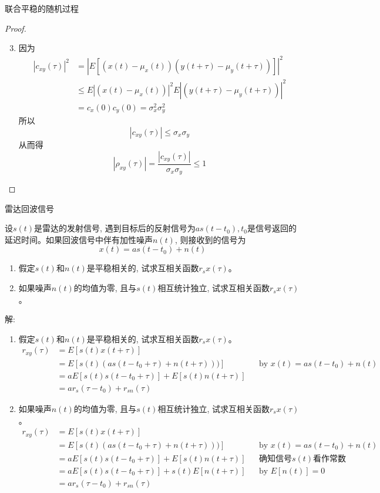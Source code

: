 \begin{frame}{联合平稳的随机过程}
\begin{proof}
	\begin{enumerate}
		\setcounter{enumi}{2} %
		\item 因为 
		\begin{align*}
		|c_{xy}(\tau)|^2&=|E[(x(t)-\mu_x(t))(y(t+\tau)-\mu_y(t+\tau))]|^2\\
		&\le E|(x(t)-\mu_x(t))|^2E|(y(t+\tau)-\mu_y(t+\tau))|^2\\
		&=c_x(0)c_y(0)=\sigma_x^2\sigma_y^2
		\end{align*}
		所以 
		\[|c_{xy}(\tau)|\le\sigma_x\sigma_y \]
		从而得
		\[|\rho_{xy}(\tau)|=\frac{|c_{xy}(\tau)|}{\sigma_x\sigma_y}\le 1 \]
	\end{enumerate}
\end{proof}
\end{frame}

\begin{frame}{雷达回波信号}
\begin{example}
	设$s(t)$是雷达的发射信号, 遇到目标后的反射信号为$as(t-t_0), t_0$是信号返回的延迟时间。如果回波信号中伴有加性噪声$n(t)$, 则接收到的信号为
	\[x(t)=as(t-t_0)+n(t) \]
	\begin{enumerate}
		\item 假定$s(t)$和$n(t)$是平稳相关的, 试求互相关函数$r_sx(\tau)$。
		\item 如果噪声$n(t)$的均值为零, 且与$s(t)$相互统计独立, 试求互相关函数$r_sx(\tau)$。
	\end{enumerate}
\end{example}
\end{frame}

\begin{frame}[shrink]
解:
	\begin{enumerate}
		\item 假定$s(t)$和$n(t)$是平稳相关的, 试求互相关函数$r_sx(\tau)$。\begin{align*}
		r_{xy}(\tau)&=E[s(t)x(t+\tau)] \\
		&=E[s(t)(as(t-t_0+\tau)+n(t+\tau)))] &&\text{by } x(t)=as(t-t_0)+n(t)\\
		&=aE[s(t)s(t-t_0+\tau)]+E[s(t)n(t+\tau)]\\
		&=ar_{s}(\tau-t_0)+r_{sn}(\tau)
		\end{align*}
		\item 如果噪声$n(t)$的均值为零, 且与$s(t)$相互统计独立, 试求互相关函数$r_sx(\tau)$。
		\begin{align*}
		r_{xy}(\tau)&=E[s(t)x(t+\tau)] \\
		&=E[s(t)(as(t-t_0+\tau)+n(t+\tau)))] &&\text{by } x(t)=as(t-t_0)+n(t)\\
		&=aE[s(t)s(t-t_0+\tau)]+E[s(t)n(t+\tau)] &&\text{确知信号$s(t)$看作常数}\\ 
		&=aE[s(t)s(t-t_0+\tau)]+s(t)E[n(t+\tau)] &&\text{by }E[n(t)]=0 \\
		&=ar_{s}(\tau-t_0)+r_{sn}(\tau)
		\end{align*}
	\end{enumerate}
\end{frame}

